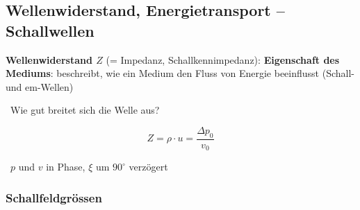 \subsection{Wellenwiderstand, Energietransport -- Schallwellen}

\begin{minipage}[c]{0.50\columnwidth}
    \textbf{Wellenwiderstand $Z$} (= Impedanz, Schallkennimpedanz): \textbf{Eigenschaft des Mediums}: beschreibt, wie ein Medium den Fluss von Energie beeinflusst (Schall- und em-Wellen)

    \textrightarrow\ \textquotesingle Wie gut breitet sich die Welle aus?\textquotesingle

    $$ \boxed{ Z = \rho \cdot u = \frac{\Delta p_0}{v_0} } $$
\end{minipage}
\hfill
\begin{minipage}[c]{0.46\columnwidth}
    \resizebox{\linewidth}{!}{}

    {\scriptsize \textrightarrow\ $p$ und $v$ in Phase, $\xi$ um $90^\circ$ verzögert}
\end{minipage}


\subsubsection{Schallfeldgrössen}

